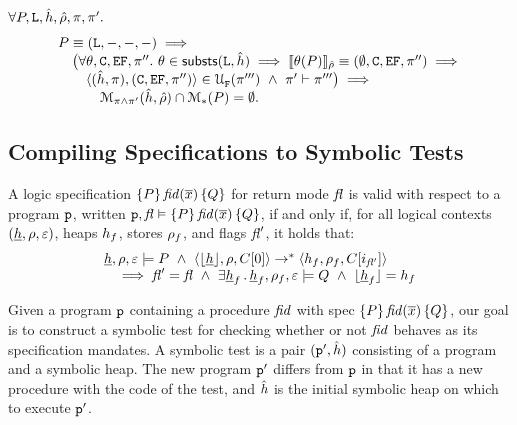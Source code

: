 \begin{theorem}
$\forall P, \existentials, \sheap, \sstore, \pc, \pc'.$
$$
\begin{array}{l}
   P \equiv (\existentials, -, -, -) \implies \\
   \quad \big( \forall \subst, \cells, \efs, \pfs''.\ \subst \in \substs(\existentials, \sheap) \implies 
   \symbeval{\subst(P)}{\sstore} \equiv (\emptyset, \cells, \efs, \pfs'') \implies \\
   \qquad \unificationfullfail{\sheap, \pc}{\cells, \efs, \pfs''}{}{\pc'''} \ \wedge \  \pc' \vdash \pfs''' \big) \implies \\
   \qquad \quad \smodels{\sheap, \sstore}{\pc \wedge \pc'} \cap \sepmodels{P} = \emptyset.   
\end{array}
$$ 
\end{theorem}





\newpage
\subsection{Compiling \jsil Specifications to Symbolic Tests}
\label{specs:to:symbolic:tests}

\begin{definition}
A \jsil logic specification $\lconf{P} \, \fid(\jvec{x}) \,  \lconf{Q}$ for return mode $\flag$ is valid with respect to a program 
$\prog$, written $\prog, \flag \vDash \lconf{P} \, \fid(\jvec{x}) \,  \lconf{Q}$,  if and only if, for all logical 
contexts $(\iheap, \store, \senv)$, heaps $\heap_f$, stores $\store_f$, and flags $\flag'$, it holds that: 
$$
\begin{array}{l}
    \iheap, \store, \senv \satisfies P \ \wedge \ \tuple{\deabstract{\iheap}, \store, \ctx[0]} \rightarrow^* \tuple{\heap_f, \store_f, \ctx[i_{\flag'}]} \\
       \quad \implies
            \flag' = \flag \ \wedge \ \exists \iheap_f \, . \, \iheap_f, \store_f, \senv \satisfies Q \ \wedge \ \deabstract{\iheap_f} = \heap_f
\end{array}
$$
\end{definition}

\noindent Given a \jsil program $\prog$ containing a procedure $\fid$ with spec {\small $\lconf{P} \, \fid(\jvec{x}) \,  \lconf{Q}$}, 
our goal is to construct a symbolic test for checking whether or not $\fid$ behaves as its specification mandates.
A symbolic test is a pair $(\prog', \sheap)$ consisting of a \jsil program and a symbolic heap. The new program $\prog'$ 
differs from $\prog$ in that it has a new \jsilmain procedure with the code of the test, and $\sheap$ is the initial 
symbolic heap on which to execute $\prog'$. 

